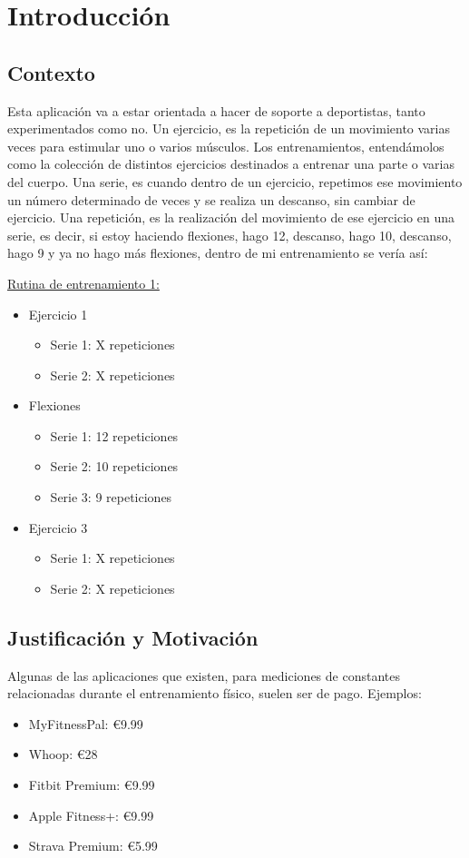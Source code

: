 \chapter{Introducción}

\section{Contexto}
Esta aplicación va a estar orientada a hacer de soporte a deportistas, tanto experimentados como no.
Un ejercicio, es la repetición de un movimiento varias veces para estimular uno o varios músculos.
Los entrenamientos, entendámolos como la colección de distintos ejercicios destinados a entrenar una parte o varias del cuerpo.
Una serie, es cuando dentro de un ejercicio, repetimos ese movimiento un número determinado de veces y se realiza un descanso, sin cambiar de ejercicio.
Una repetición, es la realización del movimiento de ese ejercicio en una serie, es decir, si estoy haciendo flexiones, hago 12, descanso, hago 10, descanso, hago 9 y ya no hago más flexiones, dentro de mi entrenamiento se vería así:


\underline {Rutina de entrenamiento 1:}
\begin{itemize}
	\item Ejercicio 1
	\begin{itemize}
		\item Serie 1: X repeticiones
		\item Serie 2: X repeticiones
	\end{itemize}
	\item Flexiones
	\begin{itemize}
		\item Serie 1: 12 repeticiones
		\item Serie 2: 10 repeticiones 
		\item Serie 3: 9 repeticiones
	\end{itemize}
	\item Ejercicio 3
	\begin{itemize}
		\item Serie 1: X repeticiones
		\item Serie 2: X repeticiones
	\end{itemize}
\end{itemize}

\section{Justificación y Motivación}
Algunas de las aplicaciones que existen, para mediciones de constantes relacionadas durante el entrenamiento físico, suelen ser de pago. Ejemplos:
\begin{itemize}
	\item MyFitnessPal: €9.99
	\item Whoop: €28
	\item Fitbit Premium: €9.99
	\item Apple Fitness+: €9.99
	\item Strava Premium: €5.99
\end{itemize}

